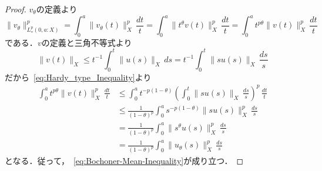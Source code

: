 \documentclass[paper=a4,
fontsize=12pt,
reqno,
uplatex,
dvipdfmx]{jlreq}
\theoremstyle{definition} %
\begin{document}
\begin{proof}
 $v_\theta$の定義より
 \begin{equation}
  \|v_\theta\|_{L^p_*(0,a:X)}^p
   =
   \int_0^a
   \|v_\theta(t)\|_X^p
   \,\frac{dt}{t}
   =
   \int_0^a
   \|t^\theta v(t)\|_X^p
   \,\frac{dt}{t}
   =
   \int_0^a
   t^{p\theta}
   \|v(t)\|_X^p
   \,\frac{dt}{t}
 \end{equation}
 である．$v$の定義と三角不等式より
 \begin{equation}
  \|v(t)\|_X
   \leq
   t^{-1}
   \int_0^t
   \|u(s)\|_X
   \,ds
   =
  t^{-1}
  \int_0^t
  \|su(s)\|_X
  \,\frac{ds}{s}
 \end{equation}
 だから~\eqref{eq:Hardy_type_Inequality}より
 \begin{equation}
  \begin{split}
   \int_0^a
   t^{p\theta}
   \|v(t)\|_X^p
   \,\frac{dt}{t}
   &\leq
   \int_0^a
   t^{-p(1-\theta)}
   \left(
   \int_0^t
   \|su(s)\|_X
   \,\frac{ds}{s}
   \right)^p
   \,\frac{dt}{t}
   \\
   &\leq
   \frac{1}{(1-\theta)^p}
   \int_0^a
   s^{-p(1-\theta)}
   \|su(s)\|^p_X
   \,\frac{ds}{s}
   \\
   &=
   \frac{1}{(1-\theta)^p}
   \int_0^a
   \|s^\theta u(s)\|^p_X
   \,\frac{ds}{s}
   \\
   &=
   \frac{1}{(1-\theta)^p}
   \int_0^a
   \|u_\theta (s)\|^p_X
   \,\frac{ds}{s}
  \end{split} 
 \end{equation}
 となる．従って，~\eqref{eq:Bochoner-Mean-Inequality}が成り立つ．
\end{proof}





\end{document}
